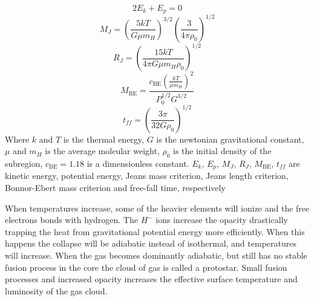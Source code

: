 \begin{flushright}
\begin{minipage}{0.75\textwidth}
  \begin{equation}
    \label{eq:virial-theorem}
    2 E_k + E_p = 0
  \end{equation}
  \begin{equation}
    \label{eq:jeans-mass}
    M_J = \left(\frac{5kT}{G\mu m_H}\right)^{3/2}\left(\frac{3}{4\pi \rho_0}\right)^{1/2}
  \end{equation}  
  \begin{equation}
    \label{eq:jeans-length}
    R_J = \left(\frac{15kT}{4\pi G\mu m_H\rho_0}\right)^{1/2}
  \end{equation}
  \begin{equation}
    \label{eq:bonnor-ebert-mass}
    M_{\scriptscriptstyle \textrm{BE}} = \frac{c_{\scriptscriptstyle \textrm{BE}}\left(\frac{kT}{\mu m_H}\right)^2}{P_0^{1/2}G^{3/2}}
  \end{equation}
  \begin{equation}
    \label{eq:ff-time-collapse}
    t_{ff} = \left(\frac{3\pi}{32G\rho_0}\right)^{1/2}
  \end{equation}
  Where $k$ and $T$ is the thermal energy, $G$ is the newtonian gravitational constant, $\mu$ and $m_H$ is the average moleular weight, $\rho_0$ is the initial density of the subregion, $c_{\scriptscriptstyle \textrm{BE}}=1.18$ is a dimensionless constant.
  $E_k$, $E_p$, $M_J$, $R_J$, $M_{\scriptscriptstyle \textrm{BE}}$, $t_{ff}$ are kinetic energy, potential energy, Jeans mass criterion, Jeans length criterion, Bonnor-Ebert mass criterion and free-fall time, respectively
\end{minipage}
\end{flushright}

When temperatures increase, some of the heavier elements will ionize and the free electrons bonds with hydrogen. The $H^-$ ions increase the opacity drastically trapping the heat from gravitational potential energy more efficiently.
When this happens the collapse will be adiabatic instead of isothermal, and temperatures will increase.
When the gas becomes dominantly adiabatic, but still has no stable fusion process in the core the cloud of gas is called a protostar.
Small fusion processes and increased opacity increases the effective surface temperature and luminosity of the gas cloud.


